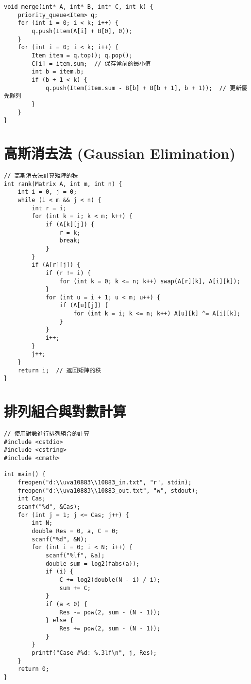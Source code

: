 \documentclass{article}
\begin{document}
\begin{multicols}{2}
\begin{lstlisting}
void merge(int* A, int* B, int* C, int k) {
    priority_queue<Item> q;
    for (int i = 0; i < k; i++) {
        q.push(Item(A[i] + B[0], 0));
    }
    for (int i = 0; i < k; i++) {
        Item item = q.top(); q.pop();
        C[i] = item.sum;  // 保存當前的最小值
        int b = item.b;
        if (b + 1 < k) {
            q.push(Item(item.sum - B[b] + B[b + 1], b + 1));  // 更新優先隊列
        }
    }
}
\end{lstlisting}

\section{高斯消去法 (Gaussian Elimination)}

\begin{lstlisting}
// 高斯消去法計算矩陣的秩
int rank(Matrix A, int m, int n) {
    int i = 0, j = 0;
    while (i < m && j < n) {
        int r = i;
        for (int k = i; k < m; k++) {
            if (A[k][j]) {
                r = k;
                break;
            }
        }
        if (A[r][j]) {
            if (r != i) {
                for (int k = 0; k <= n; k++) swap(A[r][k], A[i][k]);
            }
            for (int u = i + 1; u < m; u++) {
                if (A[u][j]) {
                    for (int k = i; k <= n; k++) A[u][k] ^= A[i][k];
                }
            }
            i++;
        }
        j++;
    }
    return i;  // 返回矩陣的秩
}
\end{lstlisting}

\section{排列組合與對數計算}

\begin{lstlisting}
// 使用對數進行排列組合的計算
#include <cstdio>
#include <cstring>
#include <cmath>

int main() {
    freopen("d:\\uva10883\\10883_in.txt", "r", stdin);
    freopen("d:\\uva10883\\10883_out.txt", "w", stdout);
    int Cas;
    scanf("%d", &Cas);
    for (int j = 1; j <= Cas; j++) {
        int N;
        double Res = 0, a, C = 0;
        scanf("%d", &N);
        for (int i = 0; i < N; i++) {
            scanf("%lf", &a);
            double sum = log2(fabs(a));
            if (i) {
                C += log2(double(N - i) / i);
                sum += C;
            }
            if (a < 0) {
                Res -= pow(2, sum - (N - 1));
            } else {
                Res += pow(2, sum - (N - 1));
            }
        }
        printf("Case #%d: %.3lf\n", j, Res);
    }
    return 0;
}
\end{lstlisting}


\end{multicols}
\end{document}
